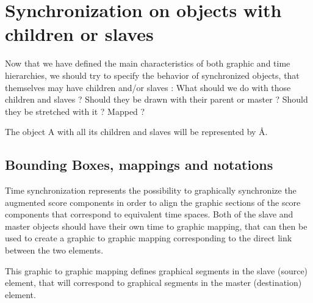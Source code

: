 \documentclass[a4paper]{article}
\begin{document}
\section{Synchronization on objects with children or slaves}\label{sec:sync_children}

Now that we have defined the main characteristics of both graphic and time hierarchies, we should try to specify the behavior of synchronized objects, that themselves may have children and/or slaves : What should we do with those children and slaves ? Should they be drawn with their parent or master ? Should they be stretched with it ? Mapped ?

The object A with all its children and slaves will be represented by \r{A}.

%
%  
%
%
%
%
%

\subsection{Bounding Boxes, mappings and notations}\label{subsec:bb}

Time synchronization represents the possibility to graphically synchronize the augmented score components in order to align the graphic sections of the score components that correspond to equivalent time spaces. Both of the slave and master objects should have their own time to graphic mapping, that can then be used to create a graphic to graphic mapping corresponding to the direct link between the two elements. 

This graphic to graphic mapping defines graphical segments in the slave (source) element, that will correspond to graphical segments in the master (destination) element.
\end{document}
